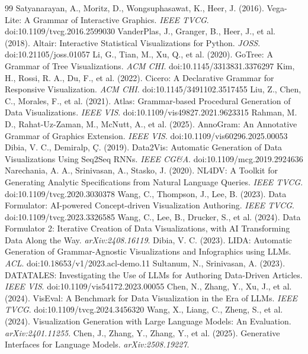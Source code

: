 \documentclass[11pt]{article}
\begin{document}
\begin{thebibliography}{99}\footnotesize
{} Satyanarayan, A., Moritz, D., Wongsuphasawat, K., Heer, J. (2016). Vega-Lite: A Grammar of Interactive Graphics. \emph{IEEE TVCG}. doi:10.1109/tvcg.2016.2599030
 VanderPlas, J., Granger, B., Heer, J., et al. (2018). Altair: Interactive Statistical Visualizations for Python. \emph{JOSS}. doi:10.21105/joss.01057
 Li, G., Tian, M., Xu, Q., et al. (2020). GoTree: A Grammar of Tree Visualizations. \emph{ACM CHI}. doi:10.1145/3313831.3376297
 Kim, H., Rossi, R. A., Du, F., et al. (2022). Cicero: A Declarative Grammar for Responsive Visualization. \emph{ACM CHI}. doi:10.1145/3491102.3517455
 Liu, Z., Chen, C., Morales, F., et al. (2021). Atlas: Grammar-based Procedural Generation of Data Visualizations. \emph{IEEE VIS}. doi:10.1109/vis49827.2021.9623315
 Rahman, M. D., Rahat-Uz-Zaman, M., McNutt, A., et al. (2025). AnnoGram: An Annotative Grammar of Graphics Extension. \emph{IEEE VIS}. doi:10.1109/vis60296.2025.00053
 Dibia, V. C., Demiralp, \c{C}. (2019). Data2Vis: Automatic Generation of Data Visualizations Using Seq2Seq RNNs. \emph{IEEE CG\&A}. doi:10.1109/mcg.2019.2924636
 Narechania, A. A., Srinivasan, A., Stasko, J. (2020). NL4DV: A Toolkit for Generating Analytic Specifications from Natural Language Queries. \emph{IEEE TVCG}. doi:10.1109/tvcg.2020.3030378
 Wang, C., Thompson, J., Lee, B. (2023). Data Formulator: AI-powered Concept-driven Visualization Authoring. \emph{IEEE TVCG}. doi:10.1109/tvcg.2023.3326585
 Wang, C., Lee, B., Drucker, S., et al. (2024). Data Formulator 2: Iterative Creation of Data Visualizations, with AI Transforming Data Along the Way. \emph{arXiv:2408.16119}.
 Dibia, V. C. (2023). LIDA: Automatic Generation of Grammar-Agnostic Visualizations and Infographics using LLMs. \emph{ACL}. doi:10.18653/v1/2023.acl-demo.11
 Sultanum, N., Srinivasan, A. (2023). DATATALES: Investigating the Use of LLMs for Authoring Data-Driven Articles. \emph{IEEE VIS}. doi:10.1109/vis54172.2023.00055
 Chen, N., Zhang, Y., Xu, J., et al. (2024). VisEval: A Benchmark for Data Visualization in the Era of LLMs. \emph{IEEE TVCG}. doi:10.1109/tvcg.2024.3456320
 Wang, X., Liang, C., Zheng, S., et al. (2024). Visualization Generation with Large Language Models: An Evaluation. \emph{arXiv:2401.11255}.
 Chen, J., Zhang, Y., Zhang, Y., et al. (2025). Generative Interfaces for Language Models. \emph{arXiv:2508.19227}.

\end{thebibliography}
\end{document}
